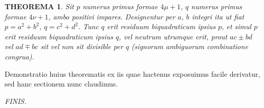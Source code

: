 \documentclass[12pt,a4paper]{article}
\theoremstyle{plain}
\newtheorem*{theorem}{THEOREMA}
\theoremstyle{definition}
\theoremstyle{remark}
\begin{document}
\begin{theorem}
Sit $p$ numerus primus formae $4\mu+1$, $q$ numerus primus formae $4\nu+1$, ambo positivi impares. Designentur per $a$, $b$ integri ita ut fiat $p = a^2 + b^2$, $q = c^2 + d^2$. Tunc $q$ erit residuum biquadraticum ipsius $p$, et simul $p$ erit residuum biquadraticum ipsius $q$, vel neutrum utrumque erit, prout $ac \pm bd$ vel $ad \mp bc$ sit vel non sit divisible per $q$ (signorum ambiguorum combinatione congrua).
\end{theorem}

Demonstratio huius theorematis ex iis quae hactenus exposuimus facile derivatur, sed hanc sectionem nunc claudimus.

\vspace{1cm}
\begin{center}
\textit{FINIS.}
\end{center}
\end{document}
